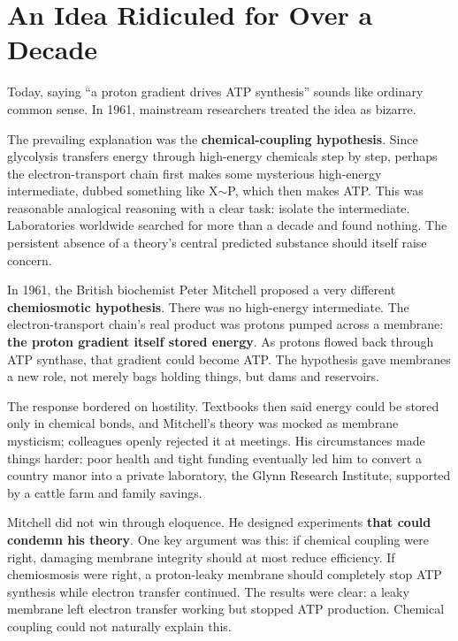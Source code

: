 \section{An Idea Ridiculed for Over a Decade}

\begin{zhengju}
Today, saying ``a proton gradient drives ATP synthesis'' sounds like ordinary common sense. In 1961, mainstream researchers treated the idea as bizarre.

The prevailing explanation was the \textbf{chemical-coupling hypothesis}. Since glycolysis transfers energy through high-energy chemicals step by step, perhaps the electron-transport chain first makes some mysterious high-energy intermediate, dubbed something like X\ensuremath{\sim}P, which then makes ATP. This was reasonable analogical reasoning with a clear task: isolate the intermediate. Laboratories worldwide searched for more than a decade and found nothing. The persistent absence of a theory's central predicted substance should itself raise concern.

In 1961, the British biochemist Peter Mitchell proposed a very different \textbf{chemiosmotic hypothesis}. There was no high-energy intermediate. The electron-transport chain's real product was protons pumped across a membrane: \textbf{the proton gradient itself stored energy}. As protons flowed back through ATP synthase, that gradient could become ATP. The hypothesis gave membranes a new role, not merely bags holding things, but dams and reservoirs.

The response bordered on hostility. Textbooks then said energy could be stored only in chemical bonds, and Mitchell's theory was mocked as membrane mysticism; colleagues openly rejected it at meetings. His circumstances made things harder: poor health and tight funding eventually led him to convert a country manor into a private laboratory, the Glynn Research Institute, supported by a cattle farm and family savings.

Mitchell did not win through eloquence. He designed experiments \textbf{that could condemn his theory}. One key argument was this: if chemical coupling were right, damaging membrane integrity should at most reduce efficiency. If chemiosmosis were right, a proton-leaky membrane should completely stop ATP synthesis while electron transfer continued. The results were clear: a leaky membrane left electron transfer working but stopped ATP production. Chemical coupling could not naturally explain this.


\end{zhengju}
